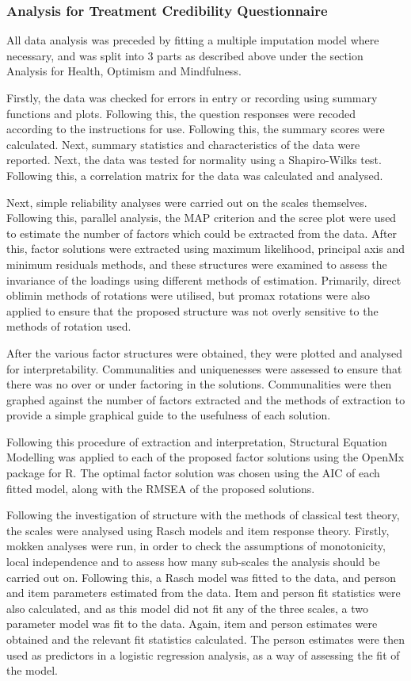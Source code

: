 \subsubsection{Analysis for Treatment Credibility Questionnaire}

All data analysis was preceded by fitting a multiple imputation model where necessary, and was split into 3 parts as described above under the section Analysis for Health, Optimism and Mindfulness. 

Firstly, the data was checked for errors in entry or recording using summary functions and plots. Following this, the question responses were recoded according to the instructions for use. Following this, the summary scores were calculated. Next, summary statistics and characteristics of the data were reported. Next, the data was tested for normality using a Shapiro-Wilks test. Following this, a correlation matrix for the data was calculated and analysed.

Next, simple reliability analyses were carried out on the scales themselves. Following this, parallel analysis, the MAP criterion and the scree plot were used to estimate the number of factors which could be extracted from the data. After this, factor solutions were extracted using maximum likelihood, principal axis and minimum residuals methods, and these structures were examined to assess the invariance of the loadings using different methods of estimation. Primarily, direct oblimin methods of rotations were utilised, but promax rotations were also applied to ensure that the proposed structure was not overly sensitive to the methods of rotation used. 

After the various factor structures were obtained, they were plotted and analysed for interpretability. Communalities and uniquenesses were assessed to ensure that there was no over or under factoring in the solutions. Communalities were then graphed against the number of factors extracted and the methods of extraction to provide a simple graphical guide to the usefulness of each solution. 

Following this procedure of extraction and interpretation, Structural Equation Modelling was applied to each of the proposed factor solutions using the OpenMx package for R. The optimal factor solution was chosen using the AIC of each fitted model, along with the RMSEA of the proposed solutions. 


Following the investigation of structure with the methods of classical test theory, the scales were analysed using Rasch models and item response theory. Firstly, mokken analyses were run, in order to check the assumptions of monotonicity, local independence and to assess how many sub-scales the analysis should be carried out on. Following this, a Rasch model was fitted to the data, and person and item parameters estimated from the data. Item and person fit statistics were also calculated, and as this model did not fit any of the three scales, a two parameter model was fit to the data. Again, item and person estimates were obtained and the relevant fit statistics calculated. The person estimates were then used as predictors in a logistic regression analysis, as a way of assessing the fit of the model.

